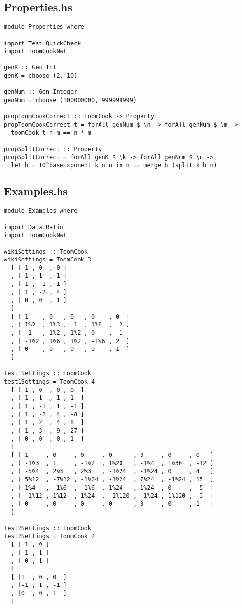 \documentclass[a4paper]{article}
\begin{document}
\subsection{Properties.hs}
\begin{verbatim}
module Properties where

import Test.QuickCheck
import ToomCookNat

genK :: Gen Int
genK = choose (2, 10)

genNum :: Gen Integer
genNum = choose (100000000, 999999999)

propToomCookCorrect :: ToomCook -> Property
propToomCookCorrect t = forAll genNum $ \n -> forAll genNum $ \m ->
  toomCook t n m == n * m

propSplitCorrect :: Property
propSplitCorrect = forAll genK $ \k -> forAll genNum $ \n ->
  let b = 10^baseExponent k n n in n == merge b (split k b n)
\end{verbatim}

\subsection{Examples.hs}
\begin{verbatim}
module Examples where

import Data.Ratio
import ToomCookNat

wikiSettings :: ToomCook
wikiSettings = ToomCook 3
  [ [ 1 , 0  , 0 ]
  , [ 1 , 1  , 1 ]
  , [ 1 , -1 , 1 ]
  , [ 1 , -2 , 4 ]
  , [ 0 , 0  , 1 ]
  ]
  [ [ 1    , 0   , 0   , 0    , 0  ]
  , [ 1%2  , 1%3 , -1  , 1%6  , -2 ]
  , [ -1   , 1%2 , 1%2 , 0    , -1 ]
  , [ -1%2 , 1%6 , 1%2 , -1%6 , 2  ]
  , [ 0    , 0   , 0   , 0    , 1  ]
  ]

test1Settings :: ToomCook
test1Settings = ToomCook 4
  [ [ 1 , 0  , 0 , 0  ]
  , [ 1 , 1  , 1 , 1  ]
  , [ 1 , -1 , 1 , -1 ]
  , [ 1 , -2 , 4 , -8 ]
  , [ 1 , 2  , 4 , 8  ]
  , [ 1 , 3  , 9 , 27 ]
  , [ 0 , 0  , 0 , 1  ]
  ]
  [ [ 1     , 0     , 0     , 0      , 0     , 0     , 0   ]
  , [ -1%3  , 1     , -1%2  , 1%20   , -1%4  , 1%30  , -12 ]
  , [ -5%4  , 2%3   , 2%3   , -1%24  , -1%24 , 0     , 4   ]
  , [ 5%12  , -7%12 , -1%24 , -1%24  , 7%24  , -1%24 , 15  ]
  , [ 1%4   , -1%6  , -1%6  , 1%24   , 1%24  , 0     , -5  ]
  , [ -1%12 , 1%12  , 1%24  , -1%120 , -1%24 , 1%120 , -3  ]
  , [ 0     , 0     , 0     , 0      , 0     , 0     , 1   ]
  ]

test2Settings :: ToomCook
test2Settings = ToomCook 2
  [ [ 1 , 0 ]
  , [ 1 , 1 ]
  , [ 0 , 1 ]
  ]
  [ [1  , 0 , 0  ]
  , [-1 , 1 , -1 ]
  , [0  , 0 , 1  ]
  ]
\end{verbatim}
\end{document}
